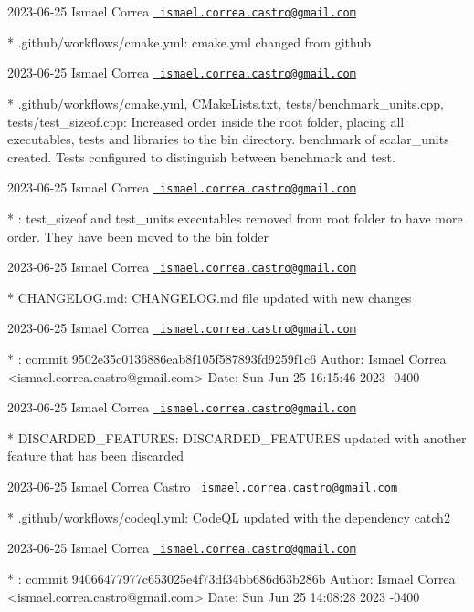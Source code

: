  2023-\/06-\/25 Ismael Correa \href{mailto:ismael.correa.castro@gmail.com}{\texttt{ ismael.\+correa.\+castro@gmail.\+com}} \begin{DoxyVerb}* .github/workflows/cmake.yml: cmake.yml changed from github
\end{DoxyVerb}
 2023-\/06-\/25 Ismael Correa \href{mailto:ismael.correa.castro@gmail.com}{\texttt{ ismael.\+correa.\+castro@gmail.\+com}} \begin{DoxyVerb}* .github/workflows/cmake.yml, CMakeLists.txt,
tests/benchmark_units.cpp, tests/test_sizeof.cpp: Increased order
inside the root folder, placing all executables, tests and libraries
to the bin directory. benchmark of scalar_units created. Tests
configured to distinguish between benchmark and test.
\end{DoxyVerb}
 2023-\/06-\/25 Ismael Correa \href{mailto:ismael.correa.castro@gmail.com}{\texttt{ ismael.\+correa.\+castro@gmail.\+com}} \begin{DoxyVerb}* : test_sizeof and test_units executables removed from root folder
to have more order. They have been moved to the bin folder
\end{DoxyVerb}
 2023-\/06-\/25 Ismael Correa \href{mailto:ismael.correa.castro@gmail.com}{\texttt{ ismael.\+correa.\+castro@gmail.\+com}} \begin{DoxyVerb}* CHANGELOG.md: CHANGELOG.md file updated with new changes
\end{DoxyVerb}
 2023-\/06-\/25 Ismael Correa \href{mailto:ismael.correa.castro@gmail.com}{\texttt{ ismael.\+correa.\+castro@gmail.\+com}} \begin{DoxyVerb}* : commit 9502e35c0136886eab8f105f587893fd9259f1c6 Author: Ismael
Correa <ismael.correa.castro@gmail.com> Date:   Sun Jun 25 16:15:46
2023 -0400
\end{DoxyVerb}
 2023-\/06-\/25 Ismael Correa \href{mailto:ismael.correa.castro@gmail.com}{\texttt{ ismael.\+correa.\+castro@gmail.\+com}} \begin{DoxyVerb}* DISCARDED_FEATURES: DISCARDED_FEATURES updated with another
feature that has been discarded
\end{DoxyVerb}
 2023-\/06-\/25 Ismael Correa Castro \href{mailto:ismael.correa.castro@gmail.com}{\texttt{ ismael.\+correa.\+castro@gmail.\+com}} \begin{DoxyVerb}* .github/workflows/codeql.yml: CodeQL updated with the dependency
catch2
\end{DoxyVerb}
 2023-\/06-\/25 Ismael Correa \href{mailto:ismael.correa.castro@gmail.com}{\texttt{ ismael.\+correa.\+castro@gmail.\+com}} \begin{DoxyVerb}* : commit 94066477977c653025e4f73df34bb686d63b286b Author: Ismael
Correa <ismael.correa.castro@gmail.com> Date:   Sun Jun 25 14:08:28
2023 -0400
\end{DoxyVerb}
